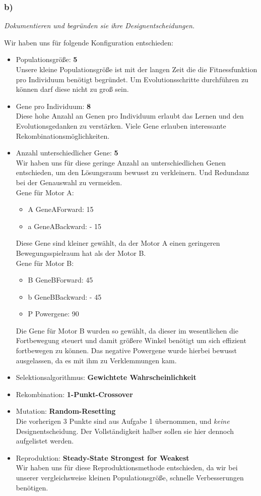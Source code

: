 \documentclass[12pt, a4paper]{article}
\begin{document}
\subsubsection*{b)}
\textit{Dokumentieren und begründen sie ihre Designentscheidungen.}

Wir haben uns für folgende Konfiguration entschieden:

\begin{itemize}
\item Populationsgröße: \textbf{5}\\
Unsere kleine Populationsgröße ist mit der langen Zeit die die
Fitnessfunktion pro Individuum benötigt begründet. Um
Evolutionsschritte durchführen zu können darf diese nicht zu groß sein.
\item Gene pro Individuum: \textbf{8}\\
Diese hohe Anzahl an Genen pro Individuum erlaubt das Lernen und den
Evolutionsgedanken zu verstärken. Viele Gene erlauben interessante Rekombinationsmöglichkeiten.
\item Anzahl unterschiedlicher Gene: \textbf{5}\\
Wir haben uns für diese geringe Anzahl an unterschiedlichen Genen
entschieden, um den Lösungsraum bewusst zu verkleinern. Und Redundanz
bei der Genauswahl zu vermeiden.\\
Gene für Motor A:
\begin{itemize}
\item A GeneAForward: 15\degree
\item a GeneABackward: - 15\degree
\end{itemize}
Diese Gene sind kleiner gewählt, da der Motor A einen geringeren Bewegungsspielraum hat als der Motor B.\\
Gene für Motor B:
\begin{itemize}
\item B GeneBForward: 45\degree
\item b GeneBBackward: - 45\degree
\item P Powergene: 90\degree
\end{itemize}
Die Gene für Motor B wurden so gewählt, da dieser im wesentlichen die Fortbewegung steuert und damit größere Winkel benötigt um sich effizient fortbewegen zu können. Das negative Powergene wurde hierbei bewusst ausgelassen, da es mit ihm zu Verklemmungen kam.
\item Selektionsalgorithmus: \textbf{Gewichtete Wahrscheinlichkeit}
\item Rekombination: \textbf{1-Punkt-Crossover}
\item Mutation: \textbf{Random-Resetting}\\
Die vorherigen 3 Punkte sind aus Aufgabe 1 übernommen, und
\textit{keine} Designentscheidung. Der Vollständigkeit halber sollen sie hier
dennoch aufgelistet werden.
\item Reproduktion: \textbf{Steady-State Strongest for Weakest}\\
Wir haben uns für diese Reproduktionsmethode entschieden, da wir bei
unserer vergleichsweise kleinen Populationsgröße, schnelle
Verbesserungen benötigen.

\end{itemize}
\end{document}
